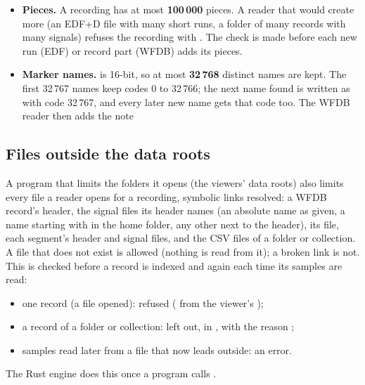\begin{itemize}
\item \textbf{Pieces.} A recording has at most \textbf{100\,000} pieces. A reader that would create
  more (an EDF+D file with many short runs, a folder of many records with many signals) refuses
  the recording with . The check is made before each new run (EDF) or record part (WFDB) adds its
  pieces.
\item \textbf{Marker names.}  is 16-bit, so at most \textbf{32\,768} distinct
  names are kept. The first 32\,767 names keep codes 0 to 32\,766; the next name found is written
  as  with code 32\,767, and every later new name gets that code too. The
  WFDB reader then adds the note 
\end{itemize}

\subsection{Files outside the data roots}
\label{sec:formats-reference-roots}

A program that limits the folders it opens (the viewers' data roots) also limits every file a
reader opens for a recording, symbolic links resolved: a WFDB record's header, the signal files
its header names (an absolute name as given, a name starting with \code{\textasciitilde} in the
home folder, any other next to the header), its  file, each segment's header and
signal files, and the CSV files of a folder or collection. A file that does not exist is allowed
(nothing is read from it); a broken link is not. This is checked before a record is indexed and
again each time its samples are read:
\begin{itemize}
\item one record (a  file opened): refused ( from the viewer's );
\item a record of a folder or collection: left out, in , with the reason
  ;
\item samples read later from a file that now leads outside: an error.
\end{itemize}
The Rust engine does this once a program calls .


